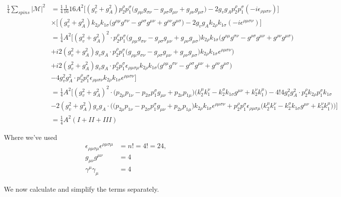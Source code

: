 \documentclass[11pt]{article}
\begin{document}
\begin{flushleft}
\begin{align*}
\frac{1}{4} \sum_{spins} |\mathcal{M}|^2 &= \frac{1}{4} \frac{1}{16} 16 A^2 \Big[
 (g_v^2 + g_A^2)p_2^{\rho} p_1^{\sigma} \big(
g_{\rho \mu} g_{\sigma \nu} 
- g_{\rho \sigma} g_{\mu \nu}
+ g_{\rho \nu} g_{\mu \sigma}
\big)
- 2 g_v g_A p_2^{\rho}  p_1^{\sigma} (-i
\epsilon_{\rho \mu \sigma \nu})
\Big]\\
&\times \Big[
(g_v^2 + g_A^2) k_{2 \rho} k_{1 \sigma} 
\big(
g^{\rho \mu} g^{\sigma \nu} 
- g^{\rho \sigma} g^{\mu \nu}
+ g^{\rho \nu} g^{\mu \sigma}
\big)
 - 2 g_v g_A 
k_{2 \rho} k_{1 \sigma} (-i
\epsilon^{\rho \mu \sigma \nu})
\Big]\\
&= \frac{1}{4} A^2 \Big[
(g_v^2 + g_A^2)^2 \cdot
 p_2^{\rho} p_1^{\sigma} \big(
g_{\rho \mu} g_{\sigma \nu} 
- g_{\rho \sigma} g_{\mu \nu}
+ g_{\rho \nu} g_{\mu \sigma}
\big) k_{2 \rho} k_{1 \sigma} 
\big(
g^{\rho \mu} g^{\sigma \nu} 
- g^{\rho \sigma} g^{\mu \nu}
+ g^{\rho \nu} g^{\mu \sigma}
\big)\\
 &+ i 2 (g_v^2 + g_A^2) g_v g_A  \cdot
 p_2^{\rho} p_1^{\sigma} \big(
g_{\rho \mu} g_{\sigma \nu} 
- g_{\rho \sigma} g_{\mu \nu}
+ g_{\rho \nu} g_{\mu \sigma}
\big)
k_{2 \rho} k_{1 \sigma} 
\epsilon^{\rho \mu \sigma \nu}
)\\
&+ i2 (g_v^2 + g_A^2) g_v g_A \cdot
p_2^{\rho}  p_1^{\sigma} 
\epsilon_{\rho \mu \sigma \mu}
 k_{2 \rho} k_{1 \sigma} 
\big(
g^{\rho \mu} g^{\sigma \nu} 
- g^{\rho \sigma} g^{\mu \nu}
+ g^{\rho \nu} g^{\mu \sigma}
\big)\\
& -4  g_v^2 g_A^2 \cdot
p_2^{\rho}  p_1^{\sigma} 
\epsilon_{\rho \mu \sigma \nu} 
k_{2 \rho} k_{1 \sigma} 
\epsilon^{\rho \mu \sigma \nu}
\Big]\\
&= \frac{1}{4} A^2 \Big[
 (g_v^2 + g_A^2)^2  \cdot
\big( p_{2 \mu} p_{1 \nu} 
- p_{2 \sigma} p_1^{ \sigma} g_{\mu \nu}
+ p_{2 \nu} p_{1 \mu} \Big)\Big( k_2^{\mu} k_1^{\nu}
- k_2^{\sigma} k_{1 \sigma} g^{\mu \nu}
+ k_2^{\nu} k_1^{\mu}\Big) -
4! 4  g_v^2 g_A^2  \cdot
p_2^{\rho}  k_{2 \rho} p_1^{\sigma} k_{1 \sigma} \\
&-
 2 (g_v^2 + g_A^2) g_v g_A  \cdot \Big( 
 \big(
 p_{2\mu} p_{1 \nu} - p_{2\sigma} p_1^{ \sigma} g_{\mu\nu}
+ p_{2\nu} p_{1 \mu}\big)
k_{2 \rho} k_{1 \sigma} \epsilon^{\rho \mu \sigma \nu}
+ p_2^{\rho}  p_1^{\sigma} \epsilon_{\rho \mu \sigma \mu}
\big( k_2^{ \mu} k_1^{ \nu}  - k_2^{ \sigma} k_{1 \sigma} g^{\mu \nu} + k_2^{ \nu} k_1^{ \mu}\big)
\Big)
\Big]\\
&= \frac{1}{4} A^2(I + II + III)
\end{align*}
\begin{center}
Where we've used
\begin{align*}
\epsilon_{\rho \mu \sigma \mu} \epsilon^{\rho \mu \sigma \mu} &= n! = 4! = 24,\\
g_{\mu \nu} g^{\mu \nu} &= 4\\
\gamma^{\mu} \gamma_{\mu} &= 4
\end{align*}
\end{center}
We now calculate and simplify the terms separately.
\end{flushleft}
\end{document}
